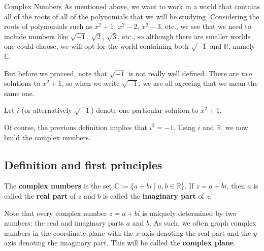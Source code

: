 \begin{section}{Complex Numbers}
As mentioned above, we want to work in a world that contains all of the roots of all of the polynomials that we will be studying. Considering the roots of polynomials such as $x^2 +1$, $x^2-2$, $x^2-3$, etc., we see that we need to include numbers like $\sqrt{-1}$, $\sqrt{2}$, $\sqrt{3}$, etc., so although there are smaller worlds one could choose, we will opt for the world containing both $\sqrt{-1}$ and $\mathbb{R}$, namely $\mathbb{C}$.

But before we proceed, note that $\sqrt{-1}$ is not really well defined. There are \emph{two} solutions to $x^2 +1$, so when we write $\sqrt{-1}$, we are all agreeing that we mean the same one. 

\begin{definition}
Let $i$ (or alternatively $\sqrt{-1}$) denote one particular solution to $x^2 +1$. 
\end{definition}

Of course, the previous definition implies that $i^2 = -1$. Using $i$ and $\mathbb{R}$, we now build the complex numbers.

\subsection{Definition and first principles}

\begin{definition}
The \textbf{complex numbers} is the set $\mathbb{C} := \{a + bi\mid a,b \in \mathbb{R}\}$. If $z=a+bi$, then $a$ is called the \textbf{real part} of $z$ and $b$ is called the \textbf{imaginary part} of $z$.
\end{definition}

Note that every complex number $z=a+bi$ is uniquely determined by two numbers: the real and imaginary parts $a$ and $b$. As such, we often graph complex numbers in the coordinate plane with the $x$-axis denoting the real part and the $y$-axis denoting the imaginary part. This will be called the \textbf{complex plane}.


\end{section}
